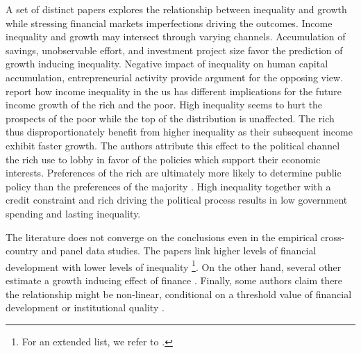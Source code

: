 \documentclass[a4paper,11pt]{article}
\begin{document}
A set of distinct papers explores the relationship between inequality and growth while stressing financial markets imperfections driving the outcomes. Income inequality and growth may intersect through varying channels. Accumulation of savings, unobservable effort, and investment project size favor the prediction of growth inducing inequality. Negative impact of inequality on human capital accumulation, entrepreneurial activity provide argument for the opposing view. 
\citet{van2018inequality} report how income inequality in the \ac{us} has different implications for the future income growth of the rich and the poor. High inequality seems to hurt the prospects of the poor while the top of the distribution is unaffected. The rich thus disproportionately benefit from higher inequality as their subsequent income exhibit faster growth. The authors attribute this effect to the political channel the rich use to lobby in favor of the policies which support their economic interests. Preferences of the rich are ultimately more likely to determine public policy than the preferences of the majority \citep{gilens_page_2014}. High inequality together with a credit constraint and rich driving the political process results in low government spending and lasting inequality.

The literature does not converge on the conclusions even in the empirical cross-country and panel data studies. The papers link higher levels of financial development with lower levels of inequality \citep{beck2007finance, hamori2012, gimet2011closer, kunieda2014finance}\footnote{For an extended list, we refer to \citet{de2017finance}.}. On the other hand, several other estimate a growth inducing effect of finance \citep{Jaumotte2013, jauch2016financial, de2017finance}. Finally, some authors claim there the relationship might be non-linear, conditional on a threshold value of financial development \citep{kim2011nonlinearity,tan2012nonlinear} or institutional quality \citep{LawSingh2014, delis2014}.
\end{document}
